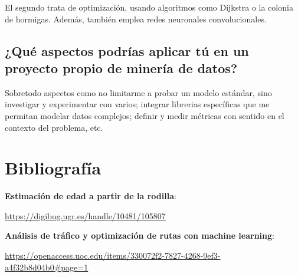 \documentclass{../../../miPlantilla}
\begin{document}
El segundo trata de optimización, usando algoritmos como Dijkstra o la colonia de hormigas. Además,
también emplea redes neuronales convolucionales.

\subsection{¿Qué aspectos podrías aplicar tú en un proyecto propio de minería de datos?}
Sobretodo aspectos como no limitarme a probar un modelo estándar, sino investigar y experimentar
con varios; integrar librerias específicas que me permitan modelar datos complejos; definir
y medir métricas con sentido en el contexto del problema, etc.

\section{Bibliografía}

\textbf{Estimación de edad a partir de la rodilla}:

\url{https://digibug.ugr.es/handle/10481/105807}

\textbf{Análisis de tráfico y optimización de rutas con machine learning}:

\url{https://openaccess.uoc.edu/items/330072f2-7827-4268-9ef3-a4f32b8d04b0#page=1}
\end{document}
